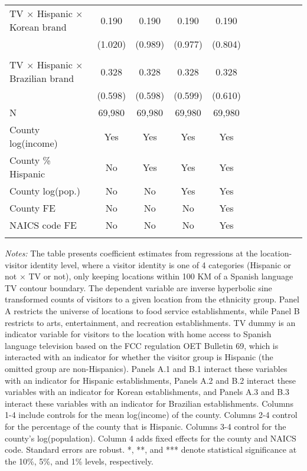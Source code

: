 \begin{table}[!htbp]
{\begin{threeparttable}
\begin{tabular}{lcccccccccc}
                              	\hline\addlinespace
				TV $\times$ Hispanic $\times$ Korean brand&       0.190 & 0.190 & 0.190 & 0.190 \\
		                    &     (1.020)   &     (0.989)   &     (0.977)   &     (0.804)   \\
				\addlinespace\hline
				\multicolumn{4}{l}{Panel A.3: Recreation --- Brazilian dummy} \\ 
                              	\hline\addlinespace
				TV $\times$ Hispanic $\times$ Brazilian brand&       0.328 & 0.328 & 0.328 & 0.328 \\
		                    &     (0.598)   &     (0.598)   &     (0.599)   &     (0.610)   \\
				\addlinespace\hline
				N & 69,980 & 69,980 & 69,980 & 69,980 \\ 
				\hline\hline\addlinespace
				County log(income) & Yes & Yes & Yes & Yes \\
				County \% Hispanic & No & Yes & Yes & Yes \\
				County log(pop.) & No & No & Yes & Yes \\
				County FE & No & No & No & Yes \\
				NAICS code FE & No & No & No & Yes \\
					\addlinespace\hline\hline
			\end{tabular}
			\begin{tablenotes}[flushleft]
				\item \textit{Notes:} The table presents coefficient estimates from regressions at the location-visitor identity level, where a visitor identity is one of 4 categories (Hispanic or not $\times$ TV or not), only keeping locations within 100 KM of a Spanish language TV contour boundary. The dependent variable are inverse hyperbolic sine transformed counts of visitors to a given location from the ethnicity group. Panel A restricts the universe of locations to food service establishments, while Panel B restricts to arts, entertainment, and recreation establishments. TV dummy is an indicator variable for visitors to the location with home access to Spanish language television based on the FCC regulation OET Bulletin 69, which is interacted with an indicator for whether the visitor group is Hispanic (the omitted group are non-Hispanics). Panels A.1 and B.1 interact these variables with an indicator for Hispanic establishments, Panels A.2 and B.2 interact these variables with an indicator for Korean establishments, and Panels A.3 and B.3 interact these variables with an indicator for Brazilian establishments.   Columns 1-4 include controls for the mean log(income) of the county. Columns 2-4 control for the percentage of the county that is Hispanic. Columns 3-4 control for the county's log(population). Column 4 adds fixed effects for the county and NAICS code. Standard errors are robust. *, **, and *** denote statistical significance at the 10\%, 5\%, and 1\% levels, respectively.
			\end{tablenotes}
		\end{threeparttable}
	}
\end{table}